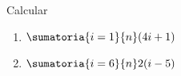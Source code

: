 \ejercicio
Calcular
\begin{multicols}{2}
	\begin{enumerate}[label=\roman*)]
		\item $ \sumatoria{i=1}{n} (4i + 1) $
		      \hacer


		\item $\sumatoria{i=6}{n} 2(i-5)$
		      \hacer

	\end{enumerate}
\end{multicols}
